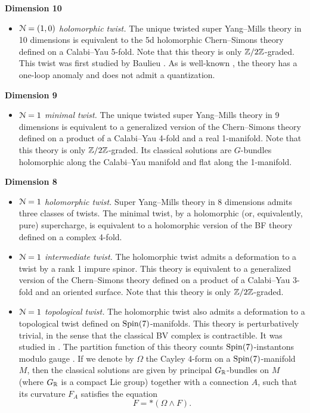 \documentclass[10pt, oneside]{article}
\begin{document}
\textbf{Dimension 10}
\begin{itemize}
 \item \emph{$\mathcal{N}=(1,0)$ holomorphic twist.} The unique twisted super Yang--Mills theory in 10 dimensions is equivalent to the 5d holomorphic Chern--Simons theory defined on a Calabi--Yau 5-fold. Note that this theory is only $\mathbb Z/2\mathbb Z$-graded. This twist was first studied by Baulieu \cite{Baulieu}. As is well-known \cite{GSanomaly}, the theory has a one-loop anomaly and does not admit a quantization.
\end{itemize}

\textbf{Dimension 9}
\begin{itemize}
 \item \emph{$\mathcal{N}=1$ minimal twist.} The unique twisted super Yang--Mills theory in 9 dimensions is equivalent to a generalized version of the Chern--Simons theory defined on a product of a Calabi--Yau 4-fold and a real 1-manifold. Note that this theory is only $\mathbb Z/2\mathbb Z$-graded. Its classical solutions are $G$-bundles holomorphic along the Calabi--Yau manifold and flat along the 1-manifold.
\end{itemize}

\textbf{Dimension 8}
\begin{itemize}
 \item \emph{$\mathcal{N}=1$ holomorphic twist.} Super Yang--Mills theory in 8 dimensions admits three classes of twists.  The minimal twist, by a holomorphic (or, equivalently, pure) supercharge, is equivalent to a holomorphic version of the BF theory defined on a complex 4-fold.
 \item \emph{$\mathcal{N}=1$ intermediate twist.} The holomorphic twist admits a deformation to a twist by a rank 1 impure spinor. This theory is equivalent to a generalized version of the Chern--Simons theory defined on a product of a Calabi--Yau 3-fold and an oriented surface. Note that this theory is only $\mathbb Z/2\mathbb Z$-graded.
 \item \emph{$\mathcal{N}=1$ topological twist.} The holomorphic twist also admits a deformation to a topological twist defined on $\mathrm{Spin}(7)$-manifolds. This theory is perturbatively trivial, in the sense that the classical BV complex is contractible. It was studied in \cite{AcharyaOLoughlinSpence,BaulieuKannoSinger}. The partition function of this theory counts $\mathrm{Spin}(7)$-instantons modulo gauge \cite{Lewis,DonaldsonThomas,ReyesCarrion}. If we denote by $\Omega$ the Cayley 4-form on a $\mathrm{Spin}(7)$-manifold $M$, then the classical solutions are given by principal $G_\mathbb R$-bundles on $M$ (where $G_\mathbb R$ is a compact Lie group) together with a connection $A$, such that its curvature $F_A$ satisfies the equation
 \[F = \ast (\Omega\wedge F).\]
\end{itemize}
\end{document}
